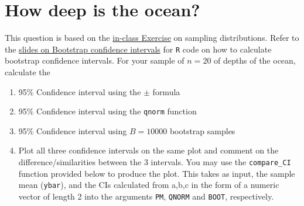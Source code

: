 \documentclass[letterpaper,9pt,twoside,printwatermark=false]{pinp}
\providecommand{\tightlist}{%
  \setlength{\itemsep}{0pt}\setlength{\parskip}{0pt}}
\begin{document}
\section{How deep is the ocean?}\label{how-deep-is-the-ocean}

This question is based on the
\href{https://github.com/sahirbhatnagar/EPIB607/blob/master/exercises/water/students/260194225_water_exercise_epib607.pdf}{in-class
Exercise} on sampling distributions. Refer to the
\href{https://github.com/sahirbhatnagar/EPIB607/raw/master/slides/bootstrap/EPIB607_bootstrap.pdf}{slides
on Bootstrap confidence intervals} for \texttt{R} code on how to
calculate bootstrap confidence intervals. For your sample of \(n=20\) of
depths of the ocean, calculate the

\begin{enumerate}
\def\labelenumi{\alph{enumi}.}
\tightlist
\item
  95\% Confidence interval using the \(\pm\) formula
\item
  95\% Confidence interval using the \texttt{qnorm} function
\item
  95\% Confidence interval using \(B=10000\) bootstrap samples
\item
  Plot all three confidence intervals on the same plot and comment on
  the difference/similarities between the 3 intervals. You may use the
  \texttt{compare\_CI} function provided below to produce the plot. This
  takes as input, the sample mean (\texttt{ybar}), and the CIs
  calculated from a,b,c in the form of a numeric vector of length 2 into
  the arguments \texttt{PM}, \texttt{QNORM} and \texttt{BOOT},
  respectively.
\end{enumerate}
\end{document}
